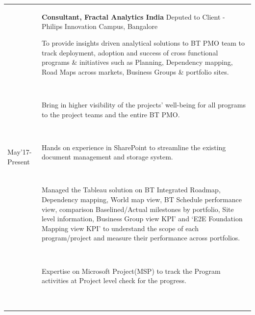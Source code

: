 \documentclass[11pt,a4paper,sans]{moderncv}
\makeatletter
\newenvironment{entrylist}{%
  \begin{tabular*}{\textwidth}{@{\extracolsep{\fill}}ll}
}{%
  \end{tabular*}
}
\newcommand{\entry}[4]{%
  #1&\parbox[t]{11.8cm}{%
    \textbf{#2}%
    \hfill%
    { \color{pblue} #3}\\%
    #4\vspace{\parsep}%
  }\\}
\newcommand\mybitem[1]{%
   \parbox[t]{2mm}{\textbullet}\parbox[t]{12.5cm}{#1}\\[1.6mm]}
\makeatother
\begin{document}
\begin{entrylist}
  \entry
    {May'17-Present }
    { Consultant, Fractal Analytics India}
    {Deputed to Client - Philips Innovation Campus, Bangalore}
    {
    \mybitem{To provide insights driven analytical solutions to BT PMO team to track deployment, adoption and success of cross functional programs \& initiatives such as Planning, Dependency mapping, Road Maps across markets, Business Groups \& portfolio sites.}
    \mybitem{Bring in higher visibility of the projects’ well-being for all programs to the project teams and the entire BT PMO.}
    \mybitem{Hands on experience in SharePoint to streamline the existing document management and storage system.}
    \mybitem{Managed the Tableau solution on BT Integrated Roadmap, Dependency mapping, World map view, BT Schedule performance view, comparison Baselined/Actual milestones by portfolio, Site level information, Business Group view KPI’ and ‘E2E Foundation Mapping view KPI’ to understand the scope of each program/project and measure their performance across portfolios.}
    \mybitem{Expertise on Microsoft Project(MSP) to track the Program activities at Project level check for the progress.}
    }
\end{entrylist}
\end{document}
